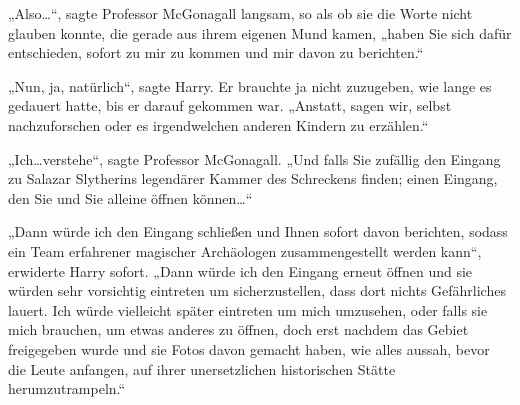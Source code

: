 

„Also…“, sagte Professor McGonagall langsam, so als ob sie die Worte nicht glauben konnte, die gerade aus ihrem eigenen Mund kamen, „haben Sie sich dafür entschieden, sofort zu mir zu kommen und mir davon zu berichten.“

„Nun, ja, natürlich“, sagte Harry. Er brauchte ja nicht zuzugeben, wie lange es gedauert hatte, bis er darauf gekommen war. „Anstatt, sagen wir, selbst nachzuforschen oder es irgendwelchen anderen Kindern zu erzählen.“

„Ich…verstehe“, sagte Professor McGonagall. „Und falls Sie zufällig den Eingang zu Salazar Slytherins legendärer Kammer des Schreckens finden; einen Eingang, den Sie und Sie alleine öffnen können…“

„Dann würde ich den Eingang schließen und Ihnen sofort davon berichten, sodass ein Team erfahrener magischer Archäologen zusammengestellt werden kann“, erwiderte Harry sofort. „Dann würde ich den Eingang erneut öffnen und sie würden sehr vorsichtig eintreten um sicherzustellen, dass dort nichts Gefährliches lauert. Ich würde vielleicht später eintreten um mich umzusehen, oder falls sie mich brauchen, um etwas anderes zu öffnen, doch erst nachdem das Gebiet freigegeben wurde und sie Fotos davon gemacht haben, wie alles aussah, bevor die Leute anfangen, auf ihrer unersetzlichen historischen Stätte herumzutrampeln.“

